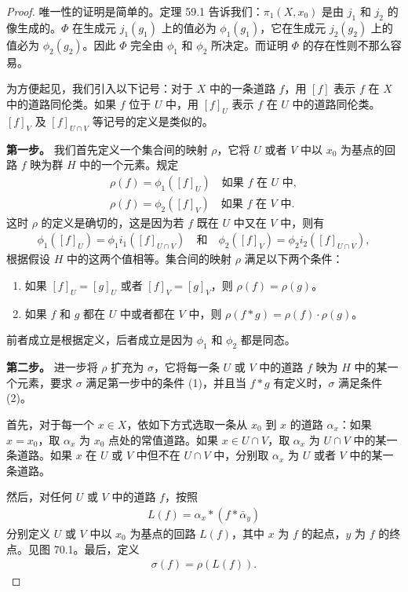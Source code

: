 \documentclass[../../main.tex]{subfiles}
\begin{document}
\begin{proof}
唯一性的证明是简单的。定理 59.1 告诉我们：$\pi_1(X,x_0)$ 是由 $j_1$ 和 $j_2$ 的像生成的。$\Phi$ 在生成元 $j_1(g_1)$ 上的值必为 $\phi_1(g_1)$，它在生成元 $j_2(g_2)$ 上的值必为 $\phi_2(g_2)$。因此 $\Phi$ 完全由 $\phi_1$ 和 $\phi_2$ 所决定。而证明 $\Phi$ 的存在性则不那么容易。

为方便起见，我们引入以下记号：对于 $X$ 中的一条道路 $f$，用 $[f]$ 表示 $f$ 在 $X$ 中的道路同伦类。如果 $f$ 位于 $U$ 中，用 $[f]_U$ 表示 $f$ 在 $U$ 中的道路同伦类。$[f]_V$ 及 $[f]_{U\cap V}$ 等记号的定义是类似的。

\textbf{第一步。} 我们首先定义一个集合间的映射 $\rho$，它将 $U$ 或者 $V$ 中以 $x_0$ 为基点的回路 $f$ 映为群 $H$ 中的一个元素。规定
\begin{align*}
\rho(f)=\phi_1([f]_U)\quad\text{如果 }f\text{ 在 }U\text{ 中},\\
\rho(f)=\phi_2([f]_V)\quad\text{如果 }f\text{ 在 }V\text{ 中}.
\end{align*}
这时 $\rho$ 的定义是确切的，这是因为若 $f$ 既在 $U$ 中又在 $V$ 中，则有
\begin{align*}
\phi_1([f]_U)=\phi_1i_1([f]_{U\cap V})\quad\text{和}\quad\phi_2([f]_V)=\phi_2i_2([f]_{U\cap V}),
\end{align*}
根据假设 $H$ 中的这两个值相等。集合间的映射 $\rho$ 满足以下两个条件：
\begin{enumerate}[(1)]
\item 如果 $[f]_U=[g]_U$ 或者 $[f]_V=[g]_V$，则 $\rho(f)=\rho(g)$。
\item 如果 $f$ 和 $g$ 都在 $U$ 中或者都在 $V$ 中，则 $\rho(f*g)=\rho(f)\cdot\rho(g)$。
\end{enumerate}
前者成立是根据定义，后者成立是因为 $\phi_1$ 和 $\phi_2$ 都是同态。

\textbf{第二步。} 进一步将 $\rho$ 扩充为 $\sigma$，它将每一条 $U$ 或 $V$ 中的道路 $f$ 映为 $H$ 中的某一个元素，要求 $\sigma$ 满足第一步中的条件 (1)，并且当 $f*g$ 有定义时，$\sigma$ 满足条件 (2)。

首先，对于每一个 $x\in X$，依如下方式选取一条从 $x_0$ 到 $x$ 的道路 $\alpha_x$：如果 $x=x_0$，取 $\alpha_x$ 为 $x_0$ 点处的常值道路。如果 $x\in U\cap V$，取 $\alpha_x$ 为 $U\cap V$ 中的某一条道路。如果 $x$ 在 $U$ 或 $V$ 中但不在 $U\cap V$ 中，分别取 $\alpha_x$ 为 $U$ 或者 $V$ 中的某一条道路。

然后，对任何 $U$ 或 $V$ 中的道路 $f$，按照
\begin{align*}
L(f)=\alpha_x*(f*\bar{\alpha}_y)
\end{align*}
分别定义 $U$ 或 $V$ 中以 $x_0$ 为基点的回路 $L(f)$，其中 $x$ 为 $f$ 的起点，$y$ 为 $f$ 的终点。见图 70.1。最后，定义
\begin{align*}
\sigma(f)=\rho(L(f)).
\end{align*}



\end{proof}
\end{document}

